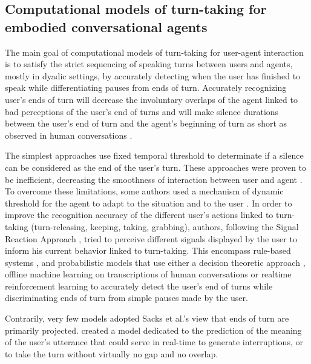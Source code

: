 \subsection{Computational models of turn-taking for embodied conversational agents}
\label{comp_modelling}

The main goal of computational models of turn-taking for user-agent interaction is to satisfy the strict sequencing of speaking turns between users and agents, mostly in
dyadic settings, by accurately detecting when the user has finished to speak while differentiating pauses from ends of turn. Accurately recognizing user's ends of turn
will decrease the involuntary overlaps of the agent linked to bad perceptions of the user's end of turns and will make silence durations between the user's end of turn and the agent's beginning of turn as short as observed
in human conversations \citep{balentine_debouncing_1997,ward_root_2005,raux_optimizing_2012,jonsdottir_distributed_2013}.

The simplest approaches use fixed temporal threshold to determinate if a silence can be considered as the end of the user's turn. These approaches were proven to be inefficient, decreasing the
smoothness of interaction between user and agent \citep{ward_root_2005}. To
overcome these limitations, some authors used a mechanism
of dynamic threshold for the agent to adapt to the
situation and to the user \citep{bohus_decisions_2011,witt_modeling_2014}. In order to improve the recognition accuracy of the different user's actions linked to turn-taking (turn-releasing, keeping, taking, grabbing), authors, following the Signal Reaction Approach \citep{duncan_signals_1972}, tried to perceive different signals displayed by the user to inform his current behavior linked to turn-taking.   
This encompass rule-based systems \citep{cassell_embodiment_1999,thorisson_natural_2002}, and probabilistic
models that use either a decision theoretic approach \citep{bohus_decisions_2011,raux_optimizing_2012}, offline machine learning on transcriptions of human conversations \citep{schlangen_reaction_2006,huang_multimodal_2011} or realtime reinforcement learning \citep{jonsdottir_distributed_2013} to accurately detect the user's end of turns while discriminating ends of turn from simple pauses made by the user. 

Contrarily, very few models adopted Sacks et al.'s view that ends of turn are primarily projected. \citep{de_vault_incremental_2011} created a model dedicated to the prediction of the meaning of the user's utterance that could serve in real-time to generate interruptions, or to take the turn without virtually no gap and no overlap.

